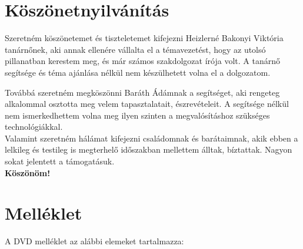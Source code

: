 \documentclass[a4paper,12pt]{report}
\begin{document}
    \section{Köszönetnyilvánítás}
    Szeretném köszönetemet és tiszteletemet kifejezni Heizlerné Bakonyi Viktória tanárnőnek, aki annak ellenére vállalta el
    a témavezetést, hogy az utolsó pillanatban kerestem meg, és már számos szakdolgozat írója volt. A tanárnő segítsége és
    téma ajánlása nélkül nem készülhetett volna el a dolgozatom.

    Továbbá szeretném megköszönni Baráth Ádámnak a segítséget, aki rengeteg alkalommal osztotta meg velem tapasztalatait, észrevételeit.
    A segítsége nélkül nem ismerkedhettem volna meg ilyen szinten a megvalósításhoz szükséges technológiákkal.\\

    Valamint szeretném hálámat kifejezni családomnak és barátaimnak, akik ebben a lelkileg és testileg is megterhelő időszakban
    mellettem álltak, bíztattak. Nagyon sokat jelentett a támogatásuk.\\

    \textbf{Köszönöm!}

    \section{Melléklet}
    A DVD melléklet az alábbi elemeket tartalmazza:
\end{document}
